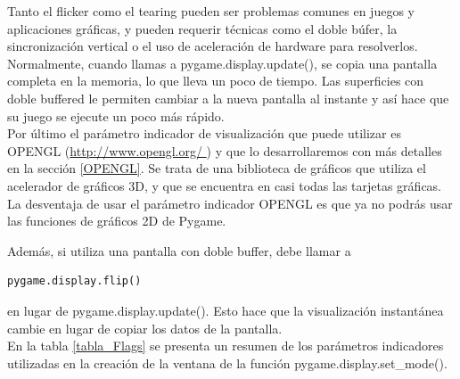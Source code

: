 {%


Tanto el flicker como el tearing pueden ser problemas comunes en juegos y aplicaciones gráficas, y pueden requerir técnicas como el doble búfer, la sincronización vertical  o el uso de aceleración de hardware para resolverlos.\\

Normalmente, cuando llamas a {\ttfamily pygame.display.update()}, se copia una pantalla completa en la memoria, lo que lleva un poco de tiempo. Las superficies con doble buffered  le permiten cambiar a la nueva pantalla al instante y así hace que su juego se ejecute un poco más rápido.\\

Por último el parámetro indicador de visualización que puede utilizar es {\ttfamily  OPENGL} (\href{http://www.opengl.org/}{\color{vino}http://www.opengl.org/ }) y que lo desarrollaremos con más detalles en la sección \ref{OPENGL}. Se trata de una biblioteca de gráficos
que utiliza el acelerador de gráficos 3D,  y que se encuentra en casi todas las tarjetas gráficas.  La desventaja de usar el  parámetro indicador  {\ttfamily  OPENGL}  es que ya no podrás usar las funciones de gráficos 2D de Pygame. 



Además,  si utiliza una pantalla con doble {\ttfamily buffer}, debe llamar a
\begin{lstlisting}		
pygame.display.flip()
\end{lstlisting}
en lugar de {\ttfamily pygame.display.update()}. Esto hace que la visualización instantánea cambie en lugar de copiar los datos de la pantalla. \\

En la tabla \ref{tabla_Flags} se presenta un resumen de los  parámetros indicadores utilizadas en la creación de la ventana de la función {\ttfamily pygame.display.set\_mode()}. 





}
